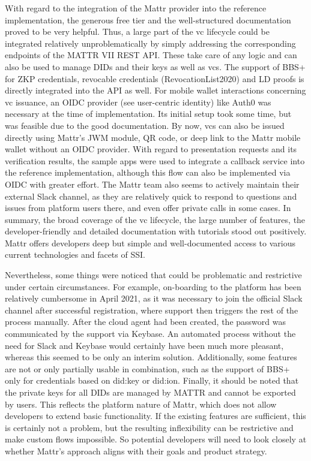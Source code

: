         With regard to the integration of the Mattr provider into the reference implementation, the generous free tier and the  well-structured documentation proved to be very helpful. Thus, a large part of the \ac{vc} lifecycle could be integrated relatively unproblematically by simply addressing the corresponding endpoints of the MATTR VII REST API. These take care of any logic and can also be used to manage \acp{DID} and their keys as well as \acp{vc}. The support of BBS+ for ZKP credentials, revocable credentials (RevocationList2020) and LD proofs is directly integrated into the API as well. For mobile wallet interactions concerning \ac{vc} issuance, an OIDC provider (see user-centric identity) like Auth0 was necessary at the time of implementation. Its initial setup took some time, but was feasible due to the good documentation. By now, \acp{vc} can also be issued directly using Mattr's JWM module, QR code, or deep link to the Mattr mobile wallet without an OIDC provider. With regard to presentation requests and its verification results, the sample apps were used to integrate a callback service into the reference implementation, although this flow can also be implemented via OIDC with greater effort. The Mattr team also seems to actively maintain their external Slack channel, as they are relatively quick to respond to questions and issues from platform users there, and even offer private calls in some cases. In summary, the broad coverage of the \ac{vc} lifecycle, the large number of features, the developer-friendly and detailed documentation with tutorials stood out positively. Mattr offers developers deep but simple and well-documented access to various current technologies and facets of \ac{SSI}.
    
        Nevertheless, some things were noticed that could be problematic and restrictive under certain circumstances. For example, on-boarding to the platform has been relatively cumbersome in April 2021, as it was necessary to join the official Slack channel after successful registration, where support then triggers the rest of the process manually. After the cloud agent had been created, the password was communicated by the support via Keybase. An automated process without the need for Slack and Keybase would certainly have been much more pleasant, whereas this seemed to be only an interim solution. Additionally, some features are not or only partially usable in combination, such as the support of BBS+ only for credentials based on did:key or did:ion. Finally, it should be noted that the private keys for all \acp{DID} are managed by MATTR and cannot be exported by users. This reflects the platform nature of Mattr, which does not allow developers to extend basic functionality. If the existing features are sufficient, this is certainly not a problem, but the resulting inflexibility can be restrictive and make custom flows impossible. So potential developers will need to look closely at whether Mattr's approach aligns with their goals and product strategy.
    
